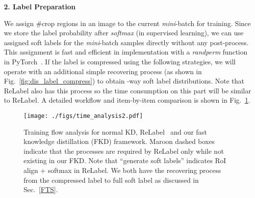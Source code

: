 \documentclass[10pt,twocolumn,letterpaper]{article}
\begin{document}
\textbf{2. Label Preparation}

We assign \#crop regions in an image to the current {\em mini}-batch for training. Since we store the label probability after {\em softmax} (in supervised learning), we can use assigned soft labels for the {\em mini}-batch samples directly without any post-process. This assignment is fast and efficient in implementation with a {\em randperm} function in PyTorch~\cite{paszke2019pytorch}. If the label is compressed using the following strategies, we will operate with an additional simple recovering process (as shown in Fig.~\ref{fig:dis_label_compress}) to obtain -way soft label distributions. Note that ReLabel also has this process so the time consumption on this part will be similar to ReLabel. A detailed workflow and item-by-item comparison is shown in Fig.~\ref{fig:time_analysis}.

\begin{figure}[t]
  \centering
  \texttt{[image: ./figs/time\_analysis2.pdf]}
  \vspace{-0.3in}
  \caption{Training flow analysis for normal KD, ReLabel~\cite{yun2021re} and our fast knowledge distillation (FKD) framework. {\color{Maroon} Maroon} dashed boxes indicate that the processes are required by ReLabel only while not existing in our FKD. Note that ``generate soft labels'' indicates RoI align + softmax in ReLabel. We both have the recovering process from the compressed label to full soft label as discussed in Sec.~\ref{FTS}.} 
  \label{fig:time_analysis}
  \vspace{-0.18in}
\end{figure}

\begin{table*}[t]
\centering
\caption{A detailed comparison of different label quantization/compression strategies on ImageNet-1K.  is the number of crops within an image and here we choose 200 crops as an example to calculate the space consumption.  is the number of images, i.e., 1.2M for ImageNet-1K.  is the size of label map.  is the number of classes.  is the parameter dimension of data augmentations to store.}
\label{tab:my-table_true_store}
\vspace{-0.1in}
\vspace{-0.16in}
\end{table*}
\end{document}
